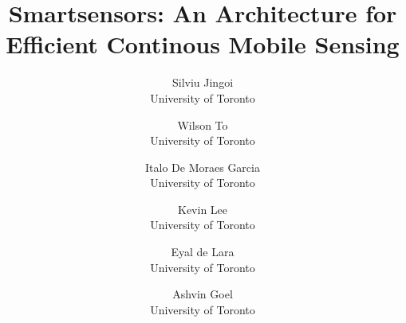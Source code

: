 \documentclass[letterpaper,twocolumn,10pt]{article}
\begin{document}
\date{}


\title{\Large \bf Smartsensors: An Architecture for Efficient
  Continous Mobile Sensing}

\author{
{\rm Silviu Jingoi}\\
University of Toronto
\and
{\rm Wilson To}\\
University of Toronto
\and
{\rm Italo De Moraes Garcia}\\
University of Toronto
\and
{\rm Kevin Lee}\\
University of Toronto
\and
{\rm Eyal de Lara}\\
University of Toronto
\and
{\rm Ashvin Goel}\\
University of Toronto
} %

\maketitle















{\footnotesize 
}
\end{document}
